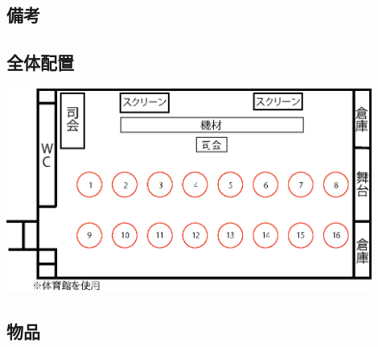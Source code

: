 \subsection{備考}

\subsection{全体配置}
\begin{center}
\includegraphics[width=12cm]{./21/reiout1.eps}
\label{fig:ice}

\end{center}

\subsection{物品}
